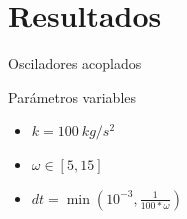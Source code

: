 \section{Resultados}\label{sec:resultados}

\begin{frame}{Osciladores acoplados}
    \begin{minipage}{0.45\textwidth}
        \begin{block}{Parámetros variables}
            \begin{itemize}
                \item $k = 100\ kg/s^2$
                \item $\omega \in [5, 15]$
                \item $dt = \min(10^{-3}, \frac{1}{100*\omega})$
            \end{itemize}
        \end{block}
    \end{minipage}
    \hfill
    \begin{minipage}{0.45\textwidth}
    \end{minipage}
\end{frame}

